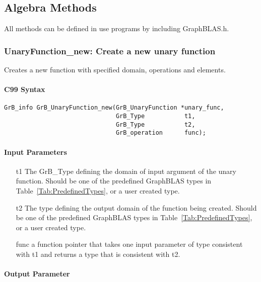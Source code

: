 \subsection{Algebra Methods}

All methods can be defined in use programs by including {\sf GraphBLAS.h}.


\subsubsection{{\sf UnaryFunction\_new}: Create a new unary function}

Creates a new function with specified domain, operations and elements.

\paragraph{C99 Syntax}

\begin{verbatim}
GrB_info GrB_UnaryFunction_new(GrB_UnaryFunction *unary_func,
                               GrB_Type           t1,
                               GrB_Type           t2,
                               GrB_operation      func);
\end{verbatim}

\paragraph{Input Parameters}

\begin{itemize}[leftmargin=1.1in]
    \item[{\sf t1}] The GrB\_Type defining the domain of input argument of
    the unary function. Should be one of the predefined
    GraphBLAS types in Table~\ref{Tab:PredefinedTypes}, or a user created type.
    \item[{\sf t2}] The type defining the output domain of the function being created. 
    Should be one of the predefined
    GraphBLAS types in Table~\ref{Tab:PredefinedTypes}, or a user created type.
    \item[{\sf func}] a function pointer that takes one input parameter of type consistent
    with t1 and returns a type that is consistent with t2.
\end{itemize}

\paragraph{Output Parameter}

